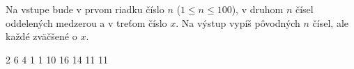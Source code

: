 




Na vstupe bude v prvom riadku číslo $n$ ($1\leq n\leq 100$), v druhom $n$ čísel oddelených medzerou a v treťom číslo $x$.
Na výstup vypíš pôvodných $n$ čísel, ale každé zväčšené o $x$.

2 6 4 1 1
10
 16 14 11 11 
\koniec


